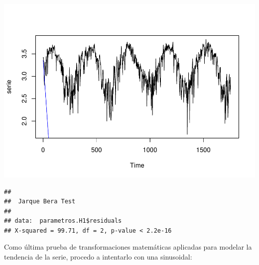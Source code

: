 \documentclass[]{article}
\newenvironment{Shaded}{\begin{snugshade}}{\end{snugshade}}
\newcommand{\KeywordTok}[1]{\textcolor[rgb]{0.13,0.29,0.53}{\textbf{#1}}}
\newcommand{\StringTok}[1]{\textcolor[rgb]{0.31,0.60,0.02}{#1}}
\newcommand{\CommentTok}[1]{\textcolor[rgb]{0.56,0.35,0.01}{\textit{#1}}}
\newcommand{\OperatorTok}[1]{\textcolor[rgb]{0.81,0.36,0.00}{\textbf{#1}}}
\newcommand{\NormalTok}[1]{#1}
\begin{document}
\includegraphics{exercise2_files/figure-latex/unnamed-chunk-18-1.pdf}

\begin{Shaded}
\end{Shaded}

\begin{verbatim}
## 
##  Jarque Bera Test
## 
## data:  parametros.H1$residuals
## X-squared = 99.71, df = 2, p-value < 2.2e-16
\end{verbatim}

Como última prueba de transformaciones matemáticas aplicadas para
modelar la tendencia de la serie, procedo a intentarlo con una
sinusoidal:
\end{document}
